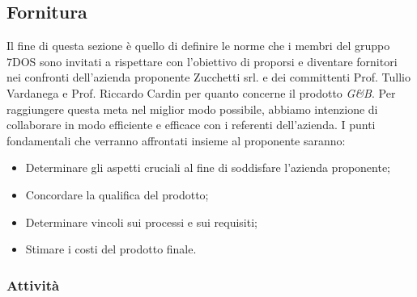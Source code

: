 \subsection{Fornitura}
Il fine di questa sezione è quello di definire le norme che i membri del gruppo 7DOS sono invitati a rispettare con l'obiettivo di proporsi e diventare fornitori nei confronti dell'azienda proponente Zucchetti srl. e dei committenti Prof. Tullio Vardanega e Prof. Riccardo Cardin per quanto concerne il prodotto \emph{G\&B}.
Per raggiungere questa meta nel miglior modo possibile, abbiamo intenzione di collaborare in modo efficiente e efficace con i referenti dell'azienda. 
I punti fondamentali che verranno affrontati insieme al proponente saranno:
\begin{itemize}
\item Determinare gli aspetti cruciali al fine di soddisfare l'azienda proponente;
\item Concordare la qualifica del prodotto;
\item Determinare vincoli sui processi e sui requisiti;
\item Stimare i costi del prodotto finale.
\end{itemize}
\subsubsection{Attività}
